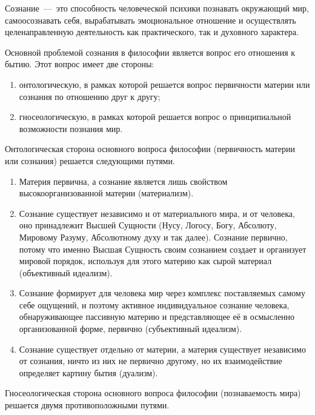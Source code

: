 \documentclass[14pt]{extarticle}
\begin{document}
\title{}
\maketitle

Сознание~---~это способность человеческой психики познавать окружающий мир, самоосознавать себя, вырабатывать эмоциональное отношение и осуществлять целенаправленную деятельность как практического, так и духовного характера.

Основной проблемой сознания в философии является вопрос его отношения к бытию. Этот вопрос имеет две стороны:

\begin{enumerate}
	\item онтологическую, в рамках которой решается вопрос первичности материи или сознания по отношению друг к другу;
	\item гносеологическую, в рамках которой решается вопрос о принципиальной возможности познания мир.
\end{enumerate}

Онтологическая сторона основного вопроса философии (первичность материи или сознания) решается следующими путями.

\begin{enumerate}
	\item Материя первична, а сознание является лишь свойством высокоорганизованной материи (материализм).
	\item Сознание существует независимо и от материального мира, и от человека, оно принадлежит Высшей Сущности (Нусу, Логосу, Богу, Абсолюту, Мировому Разуму, Абсолютному духу и так далее). Сознание первично, потому что именно Высшая Сущность своим сознанием создает и организует мировой порядок, используя для этого материю как сырой материал (объективный идеализм).
	\item Сознание формирует для человека мир через комплекс поставляемых самому себе ощущений, и поэтому активное индивидуальное сознание человека, обнаруживающее пассивную материю и представляющее её в осмысленно организованной форме, первично (субъективный идеализм).
	\item Сознание существует отдельно от материи, а материя существует независимо от сознания, ничто из них не первично другому, но их взаимодействие определяет картину бытия (дуализм).
\end{enumerate}

Гносеологическая сторона основного вопроса философии (познаваемость мира) решается двумя противоположными путями.
\end{document}
